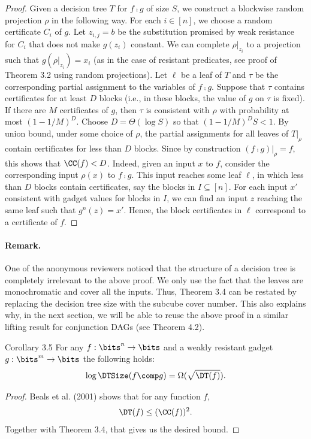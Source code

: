 \begin{proof}
Given a decision tree $T$ for $f\comp g$ of size $S$, we construct a blockwise random projection $\rho$ in the following way. For each $i\in[n]$, we choose a random certificate $C_i$ of $g$. Let $z_{i,j}=b$ be the substitution promised by weak resistance for $C_i$ that does not make $g(z_i)$ constant. We can complete $\rho|_{z_i}$ to a projection such that $g(\rho|_{z_i})=x_i$ (as in the case of resistant predicates, see proof of Theorem 3.2 using random projections).
Let $\ell$ be a leaf of $T$ and $\tau$ be the corresponding partial assignment to the variables of $f\comp g$. Suppose that $\tau$ contains certificates for at least $D$ blocks (i.e., in these blocks, the value of $g$ on $\tau$ is fixed). If there are $M$ certificates of $g$, then $\tau$ is consistent with $\rho$ with probability at most $(1-1/M)^D$. Choose $D=\Theta(\log S)$ so that $(1-1/M)^DS<1$. By union bound, under some choice of $\rho$, the partial assignments for all leaves of $T|_\rho$ contain certificates for less than $D$ blocks. Since by construction $(f\comp g)|_\rho=f$, this shows that $\CC(f)<D$.
Indeed, given an input $x$ to $f$, consider the corresponding input $\rho(x)$ to $f\comp g$. This input reaches some leaf $\ell$, in which less than $D$ blocks contain certificates, say the blocks in $I\subseteq[n]$. For each input $x'$ consistent with gadget values for blocks in $I$, we can find an input $z$ reaching the same leaf such that $g^n(z)=x'$. Hence, the block certificates in $\ell$ correspond to a certificate of $f$.
\end{proof}
\paragraph{Remark.} One of the anonymous reviewers noticed that the structure of a decision tree is completely irrelevant to the above proof. We only use the fact that the leaves are monochromatic and cover all the inputs. Thus, Theorem 3.4 can be restated by replacing the decision tree size with the subcube cover number. This also explains why, in the next section, we will be able to reuse the above proof in a similar lifting result for conjunction DAGs (see Theorem 4.2).
\begin{originalresult}{Corollary 3.5}
For any $f:\bits^n\to\bits$ and a weakly resistant gadget $g:\bits^m\to\bits$ the following holds:
\[\log\DTSize(f\comp g)=\Omega(\sqrt{\DT(f)}).\]
\end{originalresult}
\begin{proof}
Beals et al. (2001) shows that for any function $f$,
\[\DT(f)\le(\CC(f))^2.\]
Together with Theorem 3.4, that gives us the desired bound.
\end{proof}
